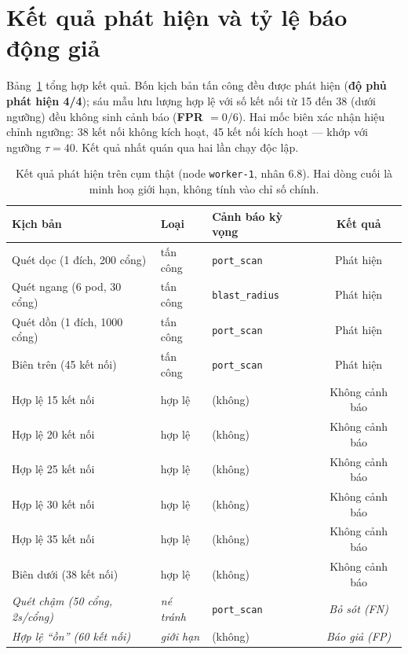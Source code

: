 \section{Kết quả phát hiện và tỷ lệ báo động giả}
\label{sec:eval-detect}

Bảng~\ref{tab:eval-detect} tổng hợp kết quả. Bốn kịch bản tấn công đều được phát
hiện (\textbf{độ phủ phát hiện 4/4}); sáu mẫu lưu lượng hợp lệ với số kết nối từ
15 đến 38 (dưới ngưỡng) đều không sinh cảnh báo (\textbf{FPR $= 0/6$}). Hai mốc
biên xác nhận hiệu chỉnh ngưỡng: 38 kết nối không kích hoạt, 45 kết nối kích
hoạt --- khớp với ngưỡng $\tau = 40$. Kết quả nhất quán qua hai lần chạy độc lập.

\begin{table}[H]
  \centering
  \caption{Kết quả phát hiện trên cụm thật (node \texttt{worker-1}, nhân 6.8).
           Hai dòng cuối là minh hoạ giới hạn, không tính vào chỉ số chính.}
  \label{tab:eval-detect}
  \small
  \begin{tabularx}{\linewidth}{@{}l l l c@{}}
    \toprule
    \textbf{Kịch bản} & \textbf{Loại} & \textbf{Cảnh báo kỳ vọng} & \textbf{Kết quả} \\
    \midrule
    Quét dọc (1 đích, 200 cổng)      & tấn công & \texttt{port\_scan}    & Phát hiện \\
    Quét ngang (6 pod, 30 cổng)      & tấn công & \texttt{blast\_radius} & Phát hiện \\
    Quét dồn (1 đích, 1000 cổng)     & tấn công & \texttt{port\_scan}    & Phát hiện \\
    Biên trên (45 kết nối)           & tấn công & \texttt{port\_scan}    & Phát hiện \\
    \midrule
    Hợp lệ 15 kết nối                & hợp lệ   & (không)                & Không cảnh báo \\
    Hợp lệ 20 kết nối                & hợp lệ   & (không)                & Không cảnh báo \\
    Hợp lệ 25 kết nối                & hợp lệ   & (không)                & Không cảnh báo \\
    Hợp lệ 30 kết nối                & hợp lệ   & (không)                & Không cảnh báo \\
    Hợp lệ 35 kết nối                & hợp lệ   & (không)                & Không cảnh báo \\
    Biên dưới (38 kết nối)           & hợp lệ   & (không)                & Không cảnh báo \\
    \midrule
    \textit{Quét chậm (50 cổng, 2s/cổng)} & \textit{né tránh} & \texttt{port\_scan} & \textit{Bỏ sót (FN)} \\
    \textit{Hợp lệ ``ồn'' (60 kết nối)}   & \textit{giới hạn} & (không) & \textit{Báo giả (FP)} \\
    \bottomrule
  \end{tabularx}
\end{table}

